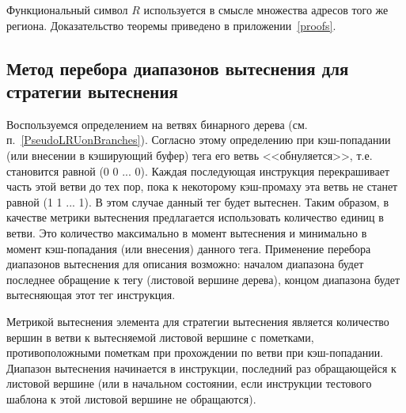 Функциональный символ $R$ используется в смысле множества адресов
того же региона. Доказательство теоремы приведено в приложении~\ref{proofs}.

\subsection{Метод перебора диапазонов вытеснения для стратегии
вытеснения \PseudoLRU}

Воспользуемся определением \PseudoLRU на ветвях бинарного дерева
(см. п.~\ref{PseudoLRUonBranches}). Согласно этому определению при
кэш-попадании (или внесении в кэширующий буфер) тега его ветвь
<<обнуляется>>, т.е. становится равной (0 0 ... 0). Каждая
последующая инструкция перекрашивает часть этой ветви до тех пор,
пока к некоторому кэш-промаху эта ветвь не станет равной (1 1 ...
1). В этом случае данный тег будет вытеснен. Таким образом, в
качестве метрики вытеснения предлагается использовать количество
единиц в ветви. Это количество максимально в момент вытеснения и
минимально в момент кэш-попадания (или внесения) данного тега.
Применение перебора диапазонов вытеснения для описания \PseudoLRU
возможно: началом диапазона будет последнее обращение к тегу
(листовой вершине дерева), концом диапазона будет вытесняющая этот
тег инструкция.

\begin{utv}
Метрикой вытеснения элемента для стратегии вытеснения \PseudoLRU
является количество вершин в ветви к вытесняемой листовой вершине с
пометками, противоположными пометкам при прохождении по ветви при
кэш-попадании. Диапазон вытеснения начинается в инструкции,
последний раз обращающейся к листовой вершине (или в начальном
состоянии, если инструкции тестового шаблона к этой листовой вершине
не обращаются).
\end{utv}


